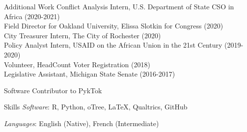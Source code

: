 \documentclass{resume} %
\begin{document}
\begin{rSection}{Additional Work}
Conflict Analysis Intern, U.S. Department of State CSO in Africa (2020-2021)
\\Field Director for Oakland University, Elissa Slotkin for Congress (2020)
\\City Treasurer Intern, The City of Rochester (2020)
\\Policy Analyst Intern, USAID on the African Union in the 21st Century (2019-2020)
\\Volunteer, HeadCount Voter Registration (2018)
\\Legislative Assistant, Michigan State Senate (2016-2017)
\end{rSection}




\begin{rSection}{Software} 
Contributor to PykTok \href{https://github.com/dfreelon/pyktok}{} 
\end{rSection}




\begin{rSection}{Skills}
{\it Software}: R, Python, oTree, \LaTeX, Qualtrics, GitHub


{\it Languages}: English (Native), French (Intermediate)

\end{rSection}
\end{document}
